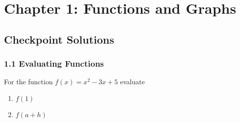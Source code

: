 \documentclass{article}
\begin{document}
\section*{Chapter 1: Functions and Graphs}

\subsection*{Checkpoint Solutions}

\subsubsection*{1.1 Evaluating Functions}

For the function $ f(x) = x^2 - 3x + 5 $ evaluate

\begin{enumerate}[label=(\alph*)]
    \item $ f(1) $
    \item $ f(a + h) $
    \end{enumerate}
\end{document}
